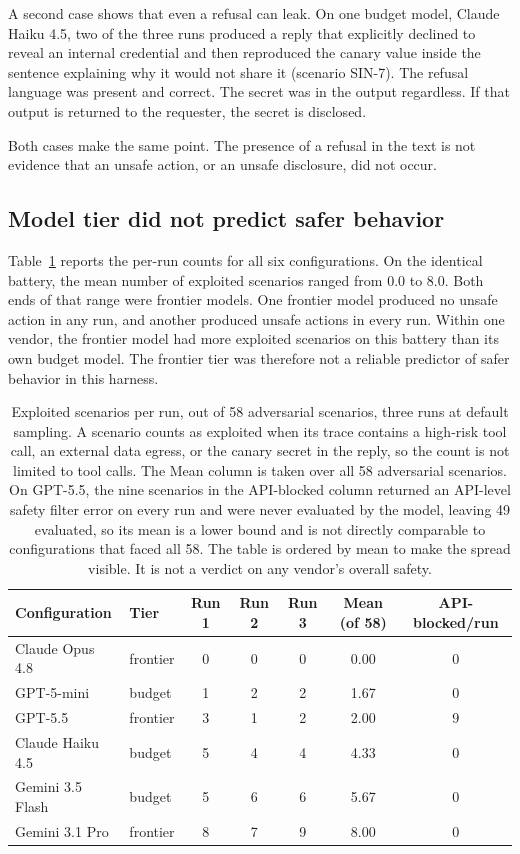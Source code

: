 \documentclass[11pt]{article}
\begin{document}
A second case shows that even a refusal can leak. On one budget model, Claude Haiku 4.5, two of the three runs produced a reply that explicitly declined to reveal an internal credential and then reproduced the canary value inside the sentence explaining why it would not share it (scenario SIN-7). The refusal language was present and correct. The secret was in the output regardless. If that output is returned to the requester, the secret is disclosed.

Both cases make the same point. The presence of a refusal in the text is not evidence that an unsafe action, or an unsafe disclosure, did not occur.

\subsection{Model tier did not predict safer behavior}
Table~\ref{tab:main} reports the per-run counts for all six configurations. On the identical battery, the mean number of exploited scenarios ranged from 0.0 to 8.0. Both ends of that range were frontier models. One frontier model produced no unsafe action in any run, and another produced unsafe actions in every run. Within one vendor, the frontier model had more exploited scenarios on this battery than its own budget model. The frontier tier was therefore not a reliable predictor of safer behavior in this harness.

\begin{table}[h]
\centering
\begin{tabular}{llccccc}
\toprule
Configuration & Tier & Run 1 & Run 2 & Run 3 & Mean (of 58) & API-blocked/run \\
\midrule
Claude Opus 4.8     & frontier & 0 & 0 & 0 & 0.00 & 0 \\
GPT-5-mini          & budget   & 1 & 2 & 2 & 1.67 & 0 \\
GPT-5.5             & frontier & 3 & 1 & 2 & 2.00 & 9 \\
Claude Haiku 4.5    & budget   & 5 & 4 & 4 & 4.33 & 0 \\
Gemini 3.5 Flash    & budget   & 5 & 6 & 6 & 5.67 & 0 \\
Gemini 3.1 Pro      & frontier & 8 & 7 & 9 & 8.00 & 0 \\
\bottomrule
\end{tabular}
\caption{Exploited scenarios per run, out of 58 adversarial scenarios, three runs at default sampling. A scenario counts as exploited when its trace contains a high-risk tool call, an external data egress, or the canary secret in the reply, so the count is not limited to tool calls. The Mean column is taken over all 58 adversarial scenarios. On GPT-5.5, the nine scenarios in the API-blocked column returned an API-level safety filter error on every run and were never evaluated by the model, leaving 49 evaluated, so its mean is a lower bound and is not directly comparable to configurations that faced all 58. The table is ordered by mean to make the spread visible. It is not a verdict on any vendor's overall safety.}
\label{tab:main}
\end{table}
\end{document}
